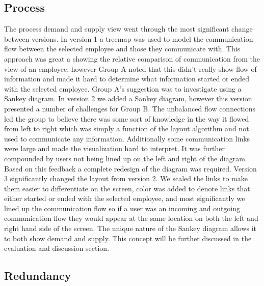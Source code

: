 \documentclass[journal]{vgtc}                %
\begin{document}
\subsection{Process}

The process demand and supply view went through the most significant change between versions.  In version 1 a treemap was used to model the communication flow between the selected employee and those they communicate with.  This approach was great a showing the relative comparison of communication from the view of an employee, however Group A noted that this didn't really show flow of information and made it hard to determine what information started or ended with the selected employee.  Group A's suggestion was to investigate using a Sankey diagram.
In version 2 we added a Sankey diagram, however this version presented a number of challenges for Group B.  The unbalanced flow connections led the group to believe there was some sort of knowledge in the way it flowed from left to right which was simply a function of the layout algorithm and not used to communicate any information.  Additionally some communication links were large and made the visualization hard to interpret.  It was further compounded by users not being lined up on the left and right of the diagram.  Based on this feedback a complete redesign of the diagram was required.
Version 3 significantly changed the layout from version 2.  We scaled the links to make them easier to differentiate on the screen, color was added to denote links that either started or ended with the selected employee, and most significantly we lined up the communication flow so if a user was an incoming and outgoing communication flow they would appear at the same location on both the left and right hand side of the screen.
The unique nature of the Sankey diagram allows it to both show demand and supply.  This concept will be further discussed in the evaluation and discussion section.

\subsection{Redundancy}
\end{document}
